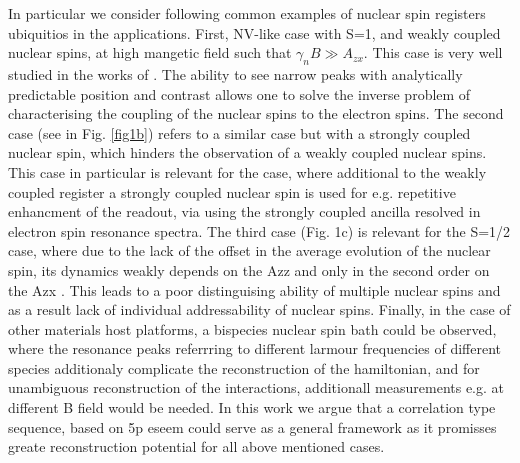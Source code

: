 \documentclass[%
 reprint,
superscriptaddress,
 amsmath,amssymb,
 aps,
]{revtex4-2}
\begin{document}
In particular we consider following common examples of nuclear spin registers ubiquitios in the applications. First, NV-like case with S=1, and weakly coupled nuclear spins, at high mangetic field such that $\gamma_n B \gg A_{zx}$. 
This case is very well studied in the works of \cite{Tam27, Tam2012, Tam2014, Wrachtrup, before}.
The ability to see narrow peaks with analytically predictable position and contrast allows one to solve the inverse problem of characterising the coupling of the nuclear spins to the electron spins. 
The second case (see in Fig. \ref{fig1b}) refers to a similar case but with a strongly coupled nuclear spin, which hinders the observation of a weakly coupled nuclear spins. 
This case in particular  is relevant for the case, where additional to the weakly coupled register a strongly coupled nuclear spin is used for e.g. repetitive  enhancment of the readout, via using the strongly coupled ancilla resolved in electron spin resonance spectra. 
The third case (Fig. 1c) is relevant for the S=1/2 case, where due to the lack of the offset in the average evolution of the nuclear spin, its dynamics weakly depends on the Azz and only in the second order on the Azx \cite{suckachev}. 
This leads to a poor distinguising ability of multiple nuclear spins and as a result lack of individual addressability of nuclear spins. 
Finally, in the case of other materials host platforms, a bispecies nuclear spin bath could be observed, where the resonance peaks referrring to different larmour frequencies of different species additionaly complicate the reconstruction of the hamiltonian, and for unambiguous reconstruction of the interactions, additionall measurements e.g. at different B field would be needed. 
In this work we argue that a correlation type sequence, based on 5p eseem could serve as a general framework as it promisses greate reconstruction potential for all above mentioned cases.  
\end{document}
